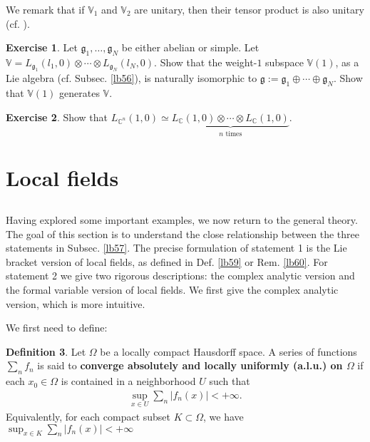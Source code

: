 \documentclass[12pt,a4paper,notitlepage]{article}
\theoremstyle{definition}
\newtheorem{df}{Definition}[section]
\newtheorem{exe}[df]{Exercise}
\theoremstyle{plain}
\newcommand{\gk}{\mathfrak g}
\newcommand{\Vbb}{\mathbb V}
\newcommand{\Cbb}{\mathbb C}
\numberwithin{equation}{section}
\begin{document}
We remark that if $\Vbb_1$ and $\Vbb_2$ are unitary, then their tensor product is also unitary (cf. \cite{DL14,CKLW18}).

\begin{exe}
Let $\gk_1,\dots,\gk_N$ be either abelian or simple. Let $\Vbb=L_{\gk_1}(l_1,0)\otimes\cdots\otimes L_{\gk_N}(l_N,0)$. Show that the weight-$1$ subspace $\Vbb(1)$, as a Lie algebra (cf. Subsec. \ref{lb56}), is naturally isomorphic to $\gk:=\gk_1\oplus\cdots\oplus\gk_N$. Show that $\Vbb(1)$ generates $\Vbb$.
\end{exe}

\begin{exe}
Show that $L_{\Cbb^n}(1,0)\simeq\underbrace{L_\Cbb(1,0)\otimes\cdots\otimes L_\Cbb(1,0)}_{n\text{ times}}$.
\end{exe}



\section{Local fields}\label{lb83}

\subsection{}

Having explored some important examples, we now return to the general theory. The goal of this section is to understand the close relationship between the three statements in Subsec. \ref{lb57}. The precise formulation of statement 1 is the Lie bracket version of local fields, as defined in Def. \ref{lb59} or Rem. \ref{lb60}. For statement 2 we give two rigorous descriptions: the complex analytic version and the formal variable version of local fields. We first give the complex analytic version, which is more intuitive. 

We first need to define:

\begin{df}
Let $\Omega$ be a locally compact Hausdorff space. A  series of functions $\sum_n f_n$ is said to \textbf{converge absolutely and locally uniformly (a.l.u.)  on $\Omega$} if  each $x_0\in\Omega$ is contained in a neighborhood $U$ such that
\begin{align*}
\sup_{x\in U}\sum_n|f_n(x)|<+\infty.	
\end{align*}
Equivalently, for each compact subset $K\subset \Omega$, we have $\sup_{x\in K}\sum_n|f_n(x)|<+\infty$
\end{df}
\end{document}
